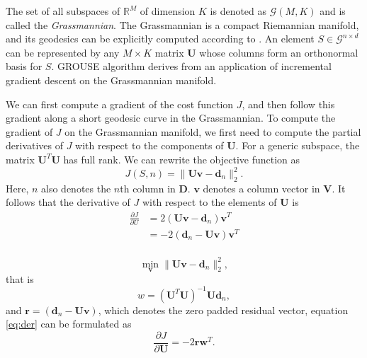 The set of all subspaces of $\mathbb{R}^M$ of dimension $K$ is denoted as $\mathcal{G}(M,K)$ and is called the \emph{Grassmannian}. The Grassmannian is a compact Riemannian manifold, and its geodesics can be explicitly computed according to \cite{edelman1988}. An element $S\in\mathcal{G}^{n\times d}$ can be represented by any $M\times K$ matrix $\mathbf{U}$ whose columns form an orthonormal basis for $S$. GROUSE algorithm derives from an application  of incremental gradient descent on the Grassmannian manifold. 

We can first compute a gradient of the cost function $J$, and then follow this gradient along a short geodesic curve in the Grassmannian. To compute the gradient of $J$ on the Grassmannian manifold, we first need to compute the partial derivatives of $J$ with respect to the components of $\mathbf{U}$. For a generic subspace, the matrix  $\mathbf{U}^T\mathbf{U}$ has full rank. 
We can rewrite the objective function as
\begin{equation}
J(S,n)=\parallel \mathbf{U}\mathbf{v}-\mathbf{d}_n \parallel_2^2.
\end{equation}
Here, $n$ also denotes the $n$th column in $\mathbf{D}$. $\mathbf{v}$ denotes a column vector in $\mathbf{V}$. It follows that the derivative of $J$ with respect to the elements of $\mathbf{U}$ is
\begin{equation}
\label{eq:der}
\begin{split}
\frac{\partial J}{\partial U} &=2(\mathbf{Uv}-\mathbf{d}_n)\mathbf{v}^T\\
&=-2(\mathbf{d}_n-\mathbf{Uv})\mathbf{v}^T\\
\end{split}
\end{equation}

\begin{equation}
\label{eq:ls}
\min_{\mathbf{v}} \parallel \mathbf{Uv}-\mathbf{d}_n \parallel_2^2,
\end{equation}
that is 
\begin{equation}
w=(\mathbf{U}^T\mathbf{U})^{-1}\mathbf{U}\mathbf{d}_n,
\end{equation}
and $\mathbf{r}=(\mathbf{d}_n-\mathbf{Uv})$, which denotes the zero padded residual vector,
equation \ref{eq:der} can be formulated as
\begin{equation}
\label{eq:der2}
\frac{\partial J}{\partial \mathbf{U}} = -2\mathbf{r}\mathbf{w}^T.
\end{equation}

